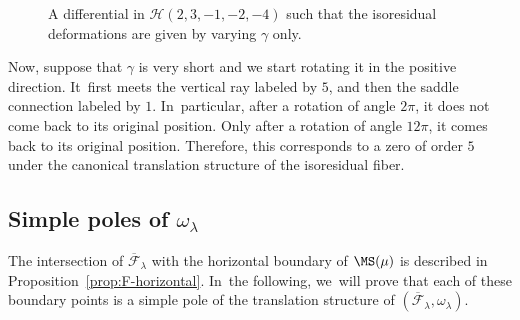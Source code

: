 \begin{ex}
\begin{figure}[ht]
\caption{A differential in $\mathcal{H}(2,3,-1,-2,-4)$ such that the isoresidual deformations are given by varying $\gamma$ only.} \label{fig:isores1}
\end{figure}
Now, suppose that $\gamma$ is very short and we start rotating it in the positive direction. It~first meets the vertical ray labeled by $5$, and then the saddle connection labeled by $1$. In~particular, after a rotation of angle $2\pi$, it does not come back to its original position. Only after a rotation of angle $12\pi$, it comes back to its original position. Therefore, this corresponds to a zero of order $5$ under the canonical translation structure of the isoresidual fiber.
\end{ex}

\subsection{Simple poles of $\omega_{\lambda}$}\label{subsub:SimplePoles}

The intersection of $\overline{\mathcal{F}}_{\lambda}$ with the horizontal boundary of $\MS(\mu)$ is described in Proposition~\ref{prop:F-horizontal}. In~the following, we~will prove that each of these boundary points is a simple pole of the translation structure of $(\overline{\mathcal{F}}_{\lambda},\omega_{\lambda})$.

